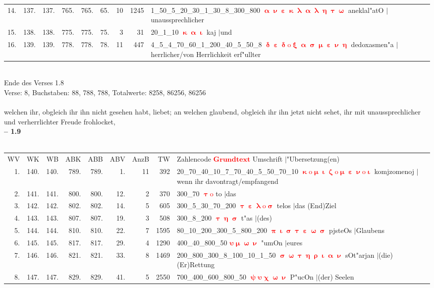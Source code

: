 \documentclass[a4paper,10pt,landscape]{article}
\begin{document}
\begin{tabular}{rrrrrrrrp{120mm}}
14.&137.&137.&765.&765.&65.&10&1245&1\_50\_5\_20\_30\_1\_30\_8\_300\_800 \textcolor{red}{$\boldsymbol{\upalpha\upnu\upepsilon\upkappa\uplambda\upalpha\uplambda\upeta\uptau\upomega}$} aneklal"atO $|$unaussprechlicher\\
15.&138.&138.&775.&775.&75.&3&31&20\_1\_10 \textcolor{red}{$\boldsymbol{\upkappa\upalpha\upiota}$} kaj $|$und\\
16.&139.&139.&778.&778.&78.&11&447&4\_5\_4\_70\_60\_1\_200\_40\_5\_50\_8 \textcolor{red}{$\boldsymbol{\updelta\upepsilon\updelta\mathrm{o}\upxi\upalpha\upsigma\upmu\upepsilon\upnu\upeta}$} dedoxasmen"a $|$herrlicher/von Herrlichkeit erf"ullter\\
\end{tabular}\medskip \\
Ende des Verses 1.8\\
Verse: 8, Buchstaben: 88, 788, 788, Totalwerte: 8258, 86256, 86256\\
\\
welchen ihr, obgleich ihr ihn nicht gesehen habt, liebet; an welchen glaubend, obgleich ihr ihn jetzt nicht sehet, ihr mit unaussprechlicher und verherrlichter Freude frohlocket,\\
\newpage 
{\bf -- 1.9}\\
\medskip \\
\begin{tabular}{rrrrrrrrp{120mm}}
WV&WK&WB&ABK&ABB&ABV&AnzB&TW&Zahlencode \textcolor{red}{$\boldsymbol{Grundtext}$} Umschrift $|$"Ubersetzung(en)\\
1.&140.&140.&789.&789.&1.&11&392&20\_70\_40\_10\_7\_70\_40\_5\_50\_70\_10 \textcolor{red}{$\boldsymbol{\upkappa\mathrm{o}\upmu\upiota\upzeta\mathrm{o}\upmu\upepsilon\upnu\mathrm{o}\upiota}$} komjzomenoj $|$wenn ihr davontragt/empfangend\\
2.&141.&141.&800.&800.&12.&2&370&300\_70 \textcolor{red}{$\boldsymbol{\uptau\mathrm{o}}$} to $|$das\\
3.&142.&142.&802.&802.&14.&5&605&300\_5\_30\_70\_200 \textcolor{red}{$\boldsymbol{\uptau\upepsilon\uplambda\mathrm{o}\upsigma}$} telos $|$das (End)Ziel\\
4.&143.&143.&807.&807.&19.&3&508&300\_8\_200 \textcolor{red}{$\boldsymbol{\uptau\upeta\upsigma}$} t"as $|$(des)\\
5.&144.&144.&810.&810.&22.&7&1595&80\_10\_200\_300\_5\_800\_200 \textcolor{red}{$\boldsymbol{\uppi\upiota\upsigma\uptau\upepsilon\upomega\upsigma}$} pjsteOs $|$Glaubens\\
6.&145.&145.&817.&817.&29.&4&1290&400\_40\_800\_50 \textcolor{red}{$\boldsymbol{\upsilon\upmu\upomega\upnu}$} "umOn $|$eures\\
7.&146.&146.&821.&821.&33.&8&1469&200\_800\_300\_8\_100\_10\_1\_50 \textcolor{red}{$\boldsymbol{\upsigma\upomega\uptau\upeta\uprho\upiota\upalpha\upnu}$} sOt"arjan $|$(die) (Er)Rettung\\
8.&147.&147.&829.&829.&41.&5&2550&700\_400\_600\_800\_50 \textcolor{red}{$\boldsymbol{\uppsi\upsilon\upchi\upomega\upnu}$} P"ucOn $|$(der) Seelen\\
\end{tabular}\medskip \\
\end{document}
